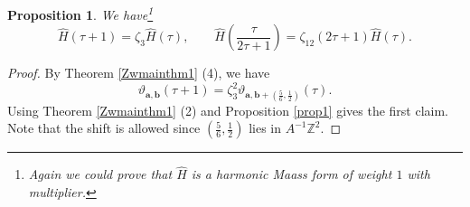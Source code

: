 \documentclass[10pt,a4paper]{amsart}
\newtheorem{proposition}{Proposition}
\renewcommand{\t}{\tau}
\newcommand{\z}{\zeta}
\begin{document}
\begin{proposition}\label{hathtrans}
We have\footnote{Again we could prove that $\widehat{H}$ is a harmonic Maass form of weight $1$ with multiplier.}
\[
\widehat{H}\left(\t+1\right)=\z_3\widehat{H}(\t),\qquad \widehat{H}\left(\frac{\t}{2\t+1}\right)=\z_{12}(2\t+1)\widehat{H}(\t).
\]
\end{proposition}

\begin{proof}
By Theorem \ref{Zwmainthm1} (4), we have 
\[
\vartheta_{\bm{a},\bm{b}}(\t+1)=\z^{2}_3\vartheta_{\bm{a},\bm{b}+\left(\frac{5}{6},\frac 12\right)}(\t).
\]
Using Theorem \ref{Zwmainthm1} (2) and Proposition \ref{prop1} gives the first claim. Note that the shift is allowed since $(\frac 56,\frac 12)$ lies in $A^{-1}\mathbb{Z}^2$.



\end{proof}
\end{document}
